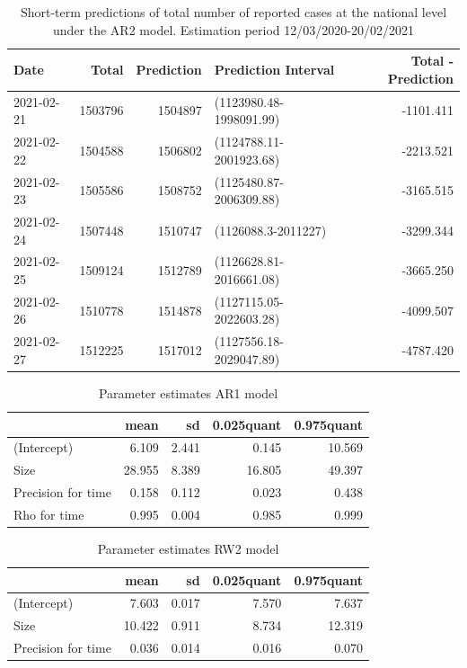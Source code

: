 \documentclass[10pt,letterpaper]{article}
\begin{document}
\begin{table}[!h]

\caption{\label{tab:unnamed-chunk-10}Short-term predictions of total number of reported cases at the national level under the AR2 model. Estimation period 12/03/2020-20/02/2021}
\centering
\begin{tabular}[t]{l|r|r|l|r}
\hline
Date & Total & Prediction & Prediction Interval & Total - Prediction\\
\hline
2021-02-21 & 1503796 & 1504897 & (1123980.48-1998091.99) & -1101.411\\
\hline
2021-02-22 & 1504588 & 1506802 & (1124788.11-2001923.68) & -2213.521\\
\hline
2021-02-23 & 1505586 & 1508752 & (1125480.87-2006309.88) & -3165.515\\
\hline
2021-02-24 & 1507448 & 1510747 & (1126088.3-2011227) & -3299.344\\
\hline
2021-02-25 & 1509124 & 1512789 & (1126628.81-2016661.08) & -3665.250\\
\hline
2021-02-26 & 1510778 & 1514878 & (1127115.05-2022603.28) & -4099.507\\
\hline
2021-02-27 & 1512225 & 1517012 & (1127556.18-2029047.89) & -4787.420\\
\hline
\end{tabular}
\end{table}

\begin{table}[!h]

\caption{\label{tab:unnamed-chunk-11}Parameter estimates AR1 model}
\centering
\begin{tabular}[t]{l|r|r|r|r}
\hline
  & mean & sd & 0.025quant & 0.975quant\\
\hline
(Intercept) & 6.109 & 2.441 & 0.145 & 10.569\\
\hline
Size & 28.955 & 8.389 & 16.805 & 49.397\\
\hline
Precision for time & 0.158 & 0.112 & 0.023 & 0.438\\
\hline
Rho for time & 0.995 & 0.004 & 0.985 & 0.999\\
\hline
\end{tabular}
\end{table}

\begin{table}[!h]

\caption{\label{tab:unnamed-chunk-11}Parameter estimates RW2 model}
\centering
\begin{tabular}[t]{l|r|r|r|r}
\hline
  & mean & sd & 0.025quant & 0.975quant\\
\hline
(Intercept) & 7.603 & 0.017 & 7.570 & 7.637\\
\hline
Size & 10.422 & 0.911 & 8.734 & 12.319\\
\hline
Precision for time & 0.036 & 0.014 & 0.016 & 0.070\\
\hline
\end{tabular}
\end{table}
\end{document}
